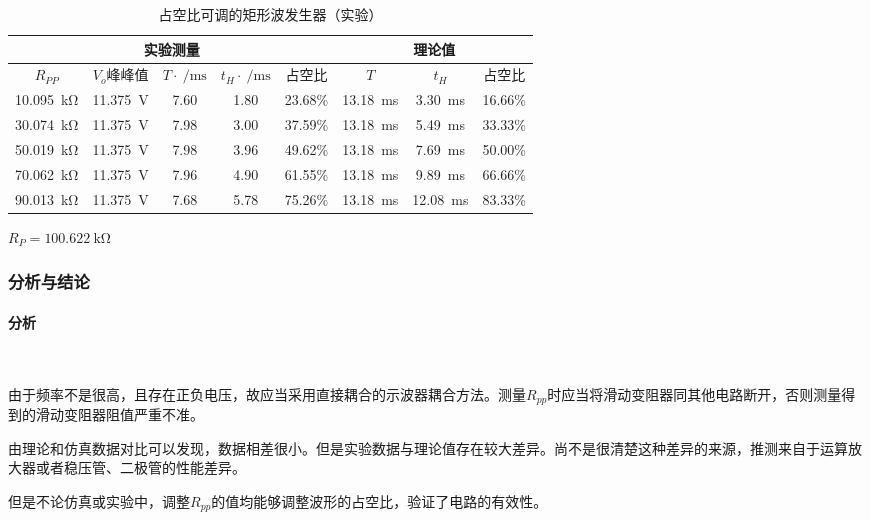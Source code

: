 \documentclass[UTF8]{ctexart}
\numberwithin{figure}{subsection}
\numberwithin{table}{subsection}
\numberwithin{equation}{subsection}
\begin{document}
\begin{table}[h]
    \begin{center}
        \caption{占空比可调的矩形波发生器（实验）}
        \begin{tabular}{|c|c|c|c|c|c|c|c|}
            \hline
            \multicolumn{5}{|c|}{实验测量} & \multicolumn{3}{c|}{理论值} \\
            \hline
            \(R_{PP}\) & \(V_o\)峰峰值 & \(T\cdot\SI{}{\per\milli\second}\) & \(t_H\cdot\SI{}{\per\milli\second}\) & 占空比 & \(T\) & \(t_H\) & 占空比 \\
            \hline
            \SI{10.095}{\kilo\ohm} & \SI{11.375}{\volt} & 7.60 & 1.80 & 23.68\% &\SI{13.18}{\milli\second} & \SI{3.30}{\milli\second} & 16.66\% \\
            \hline
            \SI{30.074}{\kilo\ohm} & \SI{11.375}{\volt} & 7.98 & 3.00 & 37.59\% & \SI{13.18}{\milli\second} & \SI{5.49}{\milli\second} & 33.33\% \\
            \hline
            \SI{50.019}{\kilo\ohm} & \SI{11.375}{\volt} & 7.98 & 3.96 & 49.62\% & \SI{13.18}{\milli\second} & \SI{7.69}{\milli\second} & 50.00\% \\
            \hline
            \SI{70.062}{\kilo\ohm} & \SI{11.375}{\volt} & 7.96 & 4.90 & 61.55\% & \SI{13.18}{\milli\second} & \SI{9.89}{\milli\second} & 66.66\% \\
            \hline
            \SI{90.013}{\kilo\ohm} & \SI{11.375}{\volt} & 7.68 & 5.78 & 75.26\% & \SI{13.18}{\milli\second} & \SI{12.08}{\milli\second} & 83.33\% \\
            \hline
        \end{tabular}
        \par \(R_P = \SI{100.622}{\kilo\ohm}\)
    \end{center}
    \label{PWM exp data}
\end{table}

\subsubsection{分析与结论}
\paragraph{分析}~{}
\par 由于频率不是很高，且存在正负电压，故应当采用直接耦合的示波器耦合方法。测量\(R_{pp}\)时应当将滑动变阻器同其他电路断开，否则测量得到的滑动变阻器阻值严重不准。
\par 由理论和仿真数据对比可以发现，数据相差很小。但是实验数据与理论值存在较大差异。尚不是很清楚这种差异的来源，推测来自于运算放大器或者稳压管、二极管的性能差异。
\par 但是不论仿真或实验中，调整\(R_{pp}\)的值均能够调整波形的占空比，验证了电路的有效性。
\end{document}
